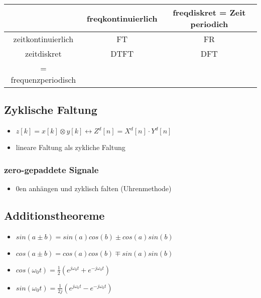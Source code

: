 \documentclass{article}
\begin{document}
 \begin{tabular}{c |c| c}
  & freqkontinuierlich & freqdiskret = Zeit periodich\\ \hline
  zeitkontinuierlich & FT & FR \\ \hline
 zeitdiskret &DTFT & DFT \\
 = frequenzperiodisch  & \\
 \end{tabular}

\subsection{Zyklische Faltung}
\begin{itemize}
\item $z[k] = x[k]\otimes y[k] \leftrightarrow Z^d[n] = X^d[n]\cdot Y^d[n]$
\item lineare Faltung als zykliche Faltung
\end{itemize}

\subsubsection{zero-gepaddete Signale}
\begin{itemize}
\item 0en anhängen und zyklisch falten (Uhrenmethode)

\end{itemize}

\subsection{Additionstheoreme}
\begin{itemize}
\item $sin(a\pm b)= sin(a)cos(b)\pm cos(a)sin(b)$
\item $cos(a \pm b)=cos(a)cos(b)\mp sin(a)sin(b)$
\item $cos(\omega_0 t) = \frac{1}{2}(e^{j\omega_0 t}+e^{-j\omega_0 t })$
\item $sin(\omega_0 t) = \frac{1}{2j}(e^{j\omega_0 t}-e^{-j\omega_0 t })$
\end{itemize}
\end{document}
